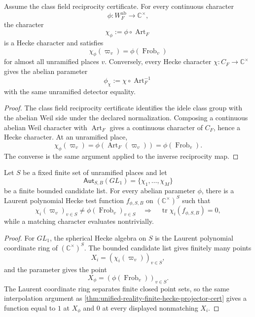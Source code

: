 \begin{theorem}
\label{thm:unified-reality-gl1-reciprocity}
Assume the class field reciprocity certificate. For every continuous
character
$$
\phi:W_F^{\mathrm{ab}}\to\mathbb C^{\times},
$$
the character
$$
\chi_{\phi}:=\phi\circ\operatorname{Art}_F
$$
is a Hecke character and satisfies
$$
\chi_{\phi}(\varpi_v)
=
\phi(\operatorname{Frob}_v)
$$
for almost all unramified places $v$. Conversely, every Hecke character
$\chi:C_F\to\mathbb C^{\times}$ gives the abelian parameter
$$
\phi_{\chi}:=\chi\circ\operatorname{Art}_F^{-1}
$$
with the same unramified detector equality.
\end{theorem}
\begin{proof}
The class field reciprocity certificate identifies the idele class group
with the abelian Weil side under the declared normalization. Composing a
continuous abelian Weil character with $\operatorname{Art}_F$ gives a
continuous character of $C_F$, hence a Hecke character. At an
unramified place,
$$
\chi_{\phi}(\varpi_v)
=
\phi(\operatorname{Art}_F(\varpi_v))
=
\phi(\operatorname{Frob}_v).
$$
The converse is the same argument applied to the inverse reciprocity
map.
\end{proof}

\begin{theorem}
\label{thm:unified-reality-gl1-finite-projector}
Let $S$ be a fixed finite set of unramified places and let
$$
\mathsf{Aut}_{S,B}(GL_1)=\{\chi_1,\ldots,\chi_M\}
$$
be a finite bounded candidate list. For every abelian parameter
$\phi$, there is a Laurent polynomial Hecke test function
$f_{\phi,S,B}$ on $(\mathbb C^{\times})^S$ such that
$$
\chi_i(\varpi_v)_{v\in S}\ne
\phi(\operatorname{Frob}_v)_{v\in S}
\quad\Longrightarrow\quad
\operatorname{tr}\chi_i(f_{\phi,S,B})=0,
$$
while a matching character evaluates nontrivially.
\end{theorem}
\begin{proof}
For $GL_1$, the spherical Hecke algebra on $S$ is the Laurent
polynomial coordinate ring of $(\mathbb C^{\times})^S$. The bounded
candidate list gives finitely many points
$$
X_i=(\chi_i(\varpi_v))_{v\in S},
$$
and the parameter gives the point
$$
X_{\phi}=(\phi(\operatorname{Frob}_v))_{v\in S}.
$$
The Laurent coordinate ring separates finite closed point sets, so the
same interpolation argument as
\autoref{thm:unified-reality-finite-hecke-projector-cert} gives a
function equal to $1$ at $X_{\phi}$ and $0$ at every displayed
nonmatching $X_i$.
\end{proof}

